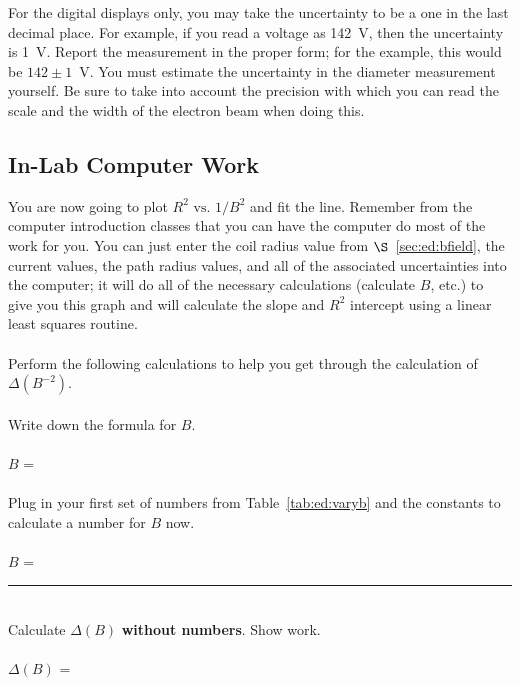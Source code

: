 \noindent For the digital displays only, you may take the 
uncertainty to be a one in the last decimal place. For example, if you read a 
voltage as 142~V, then the uncertainty is 1~V.  Report the measurement in 
the proper form; for the example, this would be $142 \pm 1$~V. You must 
estimate the uncertainty in the diameter measurement yourself. Be sure to take 
into account the precision with which you can read the scale and the width of 
the electron beam when doing this. 
 
\subsection{In-Lab Computer Work}
You are now going to plot $R^2 \mbox{ vs. } 1/B^2$ and fit the line.  
Remember from the computer 
introduction classes that you can have the computer do most of the work
for you.  You can just enter the coil radius value 
from $\S$~\ref{sec:ed:bfield}, the current values, the path radius values, and 
all of the associated uncertainties into the computer; it will do all of the 
necessary calculations (calculate $B$, etc.) to give you this graph and will 
calculate the slope and $R^2$ intercept using a linear least squares routine.\\
\ \\
  Perform 
the following calculations to help you get through the calculation of 
$\Delta(B^{-2})$. \\
\ \\
\noindent Write down the formula for $B$. \\
\vspace*{1cm} \\
\hspace*{5cm} $B$ = \\
\ \\
\noindent Plug in your first set of numbers from Table~\ref{tab:ed:varyb} 
and the constants to calculate a number for $B$ now. \\
\vspace*{1cm} \\           
\hspace*{5cm} $B$ =~\rule{3cm}{.1mm}\\ 
\noindent Calculate $\Delta(B)$ {\bf without numbers}. Show work. \\
\vspace*{3cm} \\
\hspace*{5cm} $\Delta(B)$ = \\
